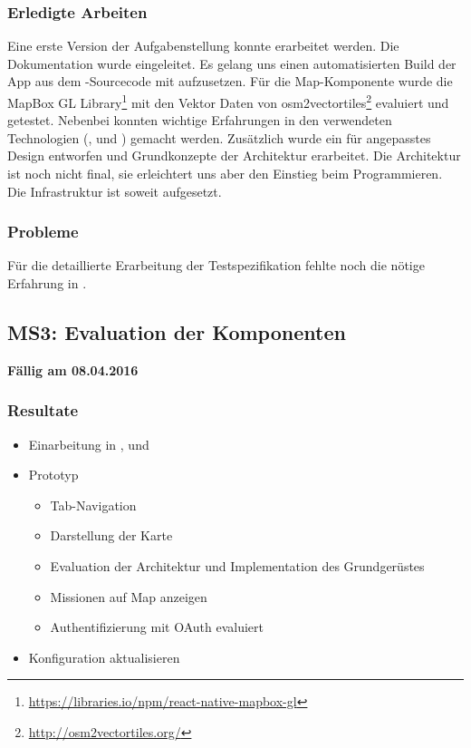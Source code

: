 \subsubsection{Erledigte Arbeiten}
Eine erste Version der Aufgabenstellung konnte erarbeitet werden. 
Die Dokumentation wurde eingeleitet.
Es gelang uns einen automatisierten Build der App aus dem -Sourcecode mit  aufzusetzen.
Für die Map-Komponente wurde die MapBox GL \gls{Library}\footnote{\url{https://libraries.io/npm/react-native-mapbox-gl}} mit den Vektor Daten von osm2vectortiles\footnote{\url{http://osm2vectortiles.org/}} evaluiert und getestet.
Nebenbei konnten wichtige Erfahrungen in den verwendeten Technologien (,  und ) gemacht werden.
Zusätzlich wurde ein für  angepasstes Design entworfen und Grundkonzepte der Architektur erarbeitet.
Die Architektur ist noch nicht final, sie erleichtert uns aber den Einstieg beim Programmieren.
Die Infrastruktur ist soweit aufgesetzt.

\subsubsection{Probleme}
Für die detaillierte Erarbeitung der Testspezifikation fehlte noch die nötige Erfahrung in .


\subsection{MS3: Evaluation der Komponenten}
\label{pm-ms3}
\textbf{Fällig am 08.04.2016}
\subsubsection{Resultate}
\begin{itemize}
	\item Einarbeitung in ,  und 
	\item {} Prototyp
	\begin{itemize}
		\item Tab-Navigation
		\item Darstellung der Karte
		\item Evaluation der Architektur und Implementation des Grundgerüstes
		\item Missionen auf Map anzeigen
		\item Authentifizierung mit \gls{OAuth} evaluiert
	\end{itemize}
	\item {} Konfiguration aktualisieren
\end{itemize}

